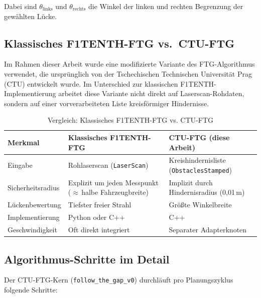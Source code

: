 Dabei sind $\theta_{\text{links}}$ und $\theta_{\text{rechts}}$ die
Winkel der linken und rechten Begrenzung der gewählten Lücke.

\subsection{Klassisches F1TENTH-FTG vs.\ CTU-FTG}

Im Rahmen dieser Arbeit wurde eine modifizierte Variante des FTG-Algorithmus
verwendet, die ursprünglich von der Tschechischen Technischen Universität Prag
(CTU) entwickelt wurde. Im Unterschied zur klassischen F1TENTH-Implementierung
arbeitet diese Variante nicht direkt auf Laserscan-Rohdaten, sondern auf
einer vorverarbeiteten Liste kreisförmiger Hindernisse.

\begin{table}[H]
\centering
\caption{Vergleich: Klassisches F1TENTH-FTG vs. CTU-FTG}
\label{tab:ftg_compare}
\begin{tabularx}{\textwidth}{lXX}
\toprule
\textbf{Merkmal} & \textbf{Klassisches F1TENTH-FTG} & \textbf{CTU-FTG (diese Arbeit)} \\
\midrule
Eingabe          & Rohlaserscan (\texttt{LaserScan})   & Kreishindernisliste (\texttt{ObstaclesStamped}) \\
Sicherheitsradius & Explizit um jeden Messpunkt ($\approx$\,halbe Fahrzeugbreite) & Implizit durch Hindernisradius (0{,}01\,m) \\
Lückenbewertung  & Tiefster freier Strahl             & Größte Winkelbreite \\
Implementierung  & Python oder C++                    & C++ \\
Geschwindigkeit  & Oft direkt integriert              & Separater Adapterknoten \\
\bottomrule
\end{tabularx}
\end{table}

\subsection{Algorithmus-Schritte im Detail}

Der CTU-FTG-Kern (\texttt{follow\_the\_gap\_v0}) durchläuft pro
Planungszyklus folgende Schritte:

